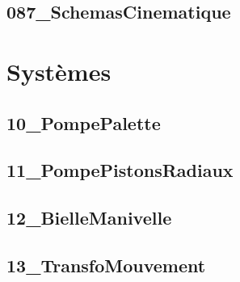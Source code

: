 \subsection{087\_SchemasCinematique}
\graphicspath{{../02-Modélisation des mécanismes/TD/Schéma_Cinématique/087_SchemasCinematique/images/}{../02-Modélisation des mécanismes/TD/Schéma_Cinématique/087_SchemasCinematique/}{../Style/png/}}


\section{Systèmes}

\subsection{10\_PompePalette}
\graphicspath{{../02-Modélisation des mécanismes/TD/Systèmes/10_PompePalette/images/}{../02-Modélisation des mécanismes/TD/Systèmes/10_PompePalette/}{../Style/png/}}


\subsection{11\_PompePistonsRadiaux}
\graphicspath{{../02-Modélisation des mécanismes/TD/Systèmes/11_PompePistonsRadiaux/images/}{../02-Modélisation des mécanismes/TD/Systèmes/11_PompePistonsRadiaux/}{../Style/png/}}


\subsection{12\_BielleManivelle}
\graphicspath{{../02-Modélisation des mécanismes/TD/Systèmes/12_BielleManivelle/images/}{../02-Modélisation des mécanismes/TD/Systèmes/12_BielleManivelle/}{../Style/png/}}


\subsection{13\_TransfoMouvement}
\graphicspath{{../02-Modélisation des mécanismes/TD/Systèmes/13_TransfoMouvement/images/}{../02-Modélisation des mécanismes/TD/Systèmes/13_TransfoMouvement/}{../Style/png/}}


